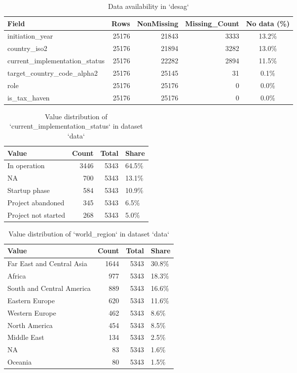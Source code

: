\documentclass[
  letterpaper,
  DIV=11,
  numbers=noendperiod]{scrreprt}
\begin{document}
\begin{longtable}[t]{lrrrc}
\caption{\label{tab:check-availability}Data availability in `desag`}\\
\toprule
Field & Rows & NonMissing & Missing\_Count & No data (\%)\\
\midrule
initiation\_year & 25176 & 21843 & 3333 & 13.2\%\\
country\_iso2 & 25176 & 21894 & 3282 & 13.0\%\\
current\_implementation\_status & 25176 & 22282 & 2894 & 11.5\%\\
target\_country\_code\_alpha2 & 25176 & 25145 & 31 & 0.1\%\\
role & 25176 & 25176 & 0 & 0.0\%\\
\addlinespace
is\_tax\_haven & 25176 & 25176 & 0 & 0.0\%\\
\bottomrule
\end{longtable}

\begin{longtable}[t]{lrrl}
\caption{\label{tab:value-summary}Value distribution of `current_implementation_status` in dataset `data`}\\
\toprule
Value & Count & Total & Share\\
\midrule
In operation & 3446 & 5343 & 64.5\%\\
NA & 700 & 5343 & 13.1\%\\
Startup phase & 584 & 5343 & 10.9\%\\
Project abandoned & 345 & 5343 & 6.5\%\\
Project not started & 268 & 5343 & 5.0\%\\
\bottomrule
\end{longtable}

\begin{longtable}[t]{lrrl}
\caption{\label{tab:value-summary}Value distribution of `world_region` in dataset `data`}\\
\toprule
Value & Count & Total & Share\\
\midrule
Far East and Central Asia & 1644 & 5343 & 30.8\%\\
Africa & 977 & 5343 & 18.3\%\\
South and Central America & 889 & 5343 & 16.6\%\\
Eastern Europe & 620 & 5343 & 11.6\%\\
Western Europe & 462 & 5343 & 8.6\%\\
\addlinespace
North America & 454 & 5343 & 8.5\%\\
Middle East & 134 & 5343 & 2.5\%\\
NA & 83 & 5343 & 1.6\%\\
Oceania & 80 & 5343 & 1.5\%\\
\bottomrule
\end{longtable}
\end{document}
